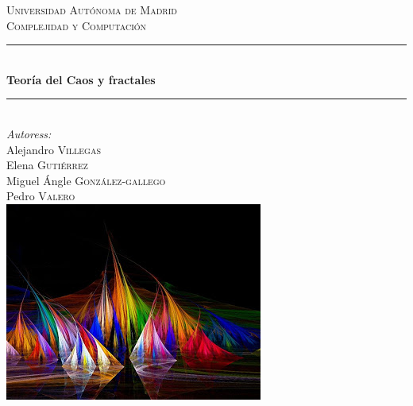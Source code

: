 \renewcommand{\headrulewidth}{0.5pt}




\begin{titlepage}

\newcommand{\HRule}{\rule{\linewidth}{0.5mm}} %

\center %


\textsc{\LARGE Universidad Autónoma de Madrid}\\[1.5cm] %
\textsc{\Large Complejidad y Computación}\\[0.5cm] %



\HRule \\[0.4cm]
{ \huge \bfseries Teoría del Caos y fractales}\\[0.4cm] %
\HRule \\[1cm]




\Large \emph{Autoress:}\\
Alejandro \textsc{Villegas}\\ %
Elena \textsc{Gutiérrez}\\ %
Miguel Ángle \textsc{González-gallego} \\
Pedro \textsc{Valero}\\[1cm] %


\includegraphics{img/Logo.jpg}\\ %


\end{titlepage}
